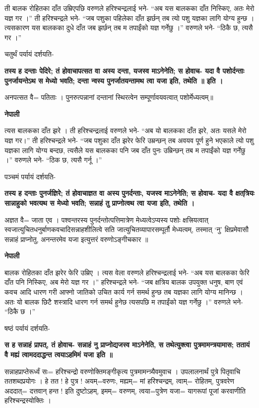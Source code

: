 \documentclass[11pt, a5paper]{article}
\begin{document}
ती बालक रोहितका दाँत उम्रिएपछि वरुणले हरिश्चन्द्रलाई भने- “अब यस बालकका दाँत निस्किए, अतः मेरो यज्ञ गर ।” ती हरिश्चन्द्रले भने- “जब पशुका पहिलेका दाँत झर्छन् तब त्यो पशु यज्ञका लागि योग्य हुन्छ । त्यसकारण यस बालकका दुधे दाँत जब झर्छन् तब म तपाईंको यज्ञ गर्नेछु ।” वरुणले भने- “ठिकै छ, त्यसै गर ।”

चतुर्थं पर्यायं दर्शयति-

\textbf{तस्य ह दन्ताः पेदिरे; तं होवाचापत्सत वा अस्य दन्ता, यजस्व माऽनेनेति; स होवाच- यदा वै पशोर्दन्ताः पुनर्जायन्तेऽथ स मेध्यो भवति; दन्ता न्वस्य पुनर्जातयन्तामथ त्वा यजा इति, तथेति ॥ इति ।}

अनपत्सत वै= पतिताः । पुनरुत्पन्नानां दन्तानां स्थिरत्वेन सम्पूर्णावयवत्वात् पशोर्मेध्यत्वम्॥

\textbf{नेपाली}

त्यस बालकका दाँत झरे । ती हरिश्चन्द्रलाई वरुणले भने- “अब यो बालकका दाँत झरे, अतः यसले मेरो यज्ञ गर।” ती हरिश्चन्द्रले भने- “जब पशुका दाँत झरेर फेरि उम्रन्छन् तब अवयव पूर्ण हुने भएकाले त्यो पशु यज्ञका लागि योग्य बन्दछ, त्यसैले यस बालकका पनि जब दाँत पुनः उम्रिन्छन् तब म तपाईंको यज्ञ गर्नेछु ।” वरुणले भने- “ठिक छ, त्यसै गर्नू ।”

पञ्चमं पर्यायं दर्शयति-

\textbf{तस्य ह दन्ताः पुनर्जज्ञिरे; तं होवाचाज्ञत वा अस्य पुनर्दन्ताः, यजस्व माऽनेनेति; स होवाच- यदा वै क्षत्‌त्रियः सान्नाहुको भवत्यथ स मेध्यो भवति; सन्नाहं तु प्राप्नोत्वथ त्वा यजा इति, तथेति ।}

अज्ञत वै= जाता एव । पश्वन्तरस्य पुनर्दन्तोत्पत्तिमात्रेण मेध्यत्वेऽप्यस्य पशोः क्षत्त्रियत्वात् स्वजात्युचितधनुर्बाणकवचादिसन्नाहशीलित्वे सति जात्युचितव्यापारसम्पूर्तौ मेध्यत्वम्, तस्मात् ‘नु’ क्षिप्रमेवासौ सन्नाहं प्राप्नोतु, अनन्तरमेव यजा इत्युत्तरं वरुणोऽङ्‍गीचकार ॥

\textbf{नेपाली}

बालक रोहितका दाँत झरेर फेरि उम्रिए । त्यस वेला वरुणले हरिश्चन्द्रलाई भने- “अब यस बालकका फेरि दाँत पनि निस्किए, अब मेरो यज्ञ गर ।” हरिश्चन्द्रले भने- “जब क्षत्रिय बालक उपयुक्त धनुष, बाण एवं कवच आदि धारण गरी आफ्नो जातिको उचित कार्य गर्न समर्थ हुन्छ तब यज्ञका लागि योग्य मानिन्छ । अतः यो बालक छिटै शस्त्रादि धारण गर्न समर्थ हुनेछ त्यसपछि म तपाईंको यज्ञ गर्नेछु ।” वरुणले भने- “ठिकै छ ।”

षष्ठं पर्यायं दर्शयति-

\textbf{स ह सन्नाहं प्रापत्, तं होवाच- सन्नाहं नु प्राप्नोद्यजस्व माऽनेनेति, स तथेत्युक्त्वा पुत्रमामन्त्रयामास; ततायं वै मह्यं त्वामददाद्धन्त त्वयाऽहमिमं यजा इति ॥}

सन्नाहप्राप्तेरूर्ध्वं सः= हरिश्चन्द्रो वरुणोक्तिमङ्‍गीकृत्य पुत्रमामन्त्र्यैवमुवाच । उपलालनार्थं पुत्रे पितृवाचि ततशब्दप्रयोगः । हे तत ! हे पुत्र ! अयम्=वरुणः, मह्यम्= मां हरिश्चन्द्रम्, त्वाम्= रोहितम्, पुत्रवरेण अददात्= दत्तवान् हन्त !  इति दुष्टोऽहम्, इमम्= वरुणम्, त्वया=पुत्रेण यजा= यागरूपां पूजां करवाणीति हरिश्चन्द्रस्योक्तिः ।
\end{document}
